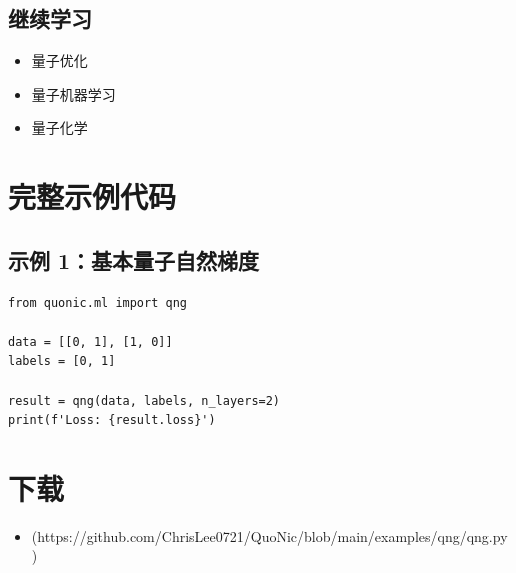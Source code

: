 \documentclass[12pt,a4paper]{article}
\begin{document}
\subsection{继续学习}
\begin{itemize}
  \item 量子优化
  \item 量子机器学习
  \item 量子化学
\end{itemize}

\section{完整示例代码}

\subsection{示例 1：基本量子自然梯度}

\begin{verbatim}
from quonic.ml import qng

data = [[0, 1], [1, 0]]
labels = [0, 1]

result = qng(data, labels, n_layers=2)
print(f'Loss: {result.loss}')
\end{verbatim}

\section{下载}

\begin{itemize}
  \item [qng.py](https://github.com/ChrisLee0721/QuoNic/blob/main/examples/qng/qng.py)
\end{itemize}
\end{document}
